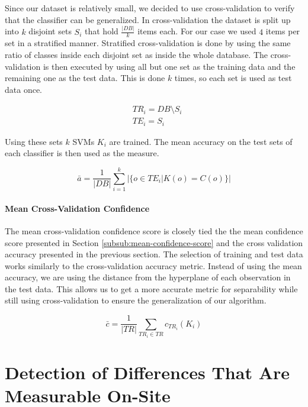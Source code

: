 \documentclass[pdftex,12pt,a4paper]{report}
\begin{document}
Since our dataset is relatively small, we decided to use cross-validation to verify that the classifier can be
generalized. In cross-validation the dataset is split up into $k$ disjoint sets $S_i$ that hold $\frac{|DB|}{k}$ items each. For our case we used $4$ items per set in a stratified manner. Stratified cross-validation is done by using the same ratio of classes inside each disjoint set as inside the whole database. The cross-validation is then
executed by using all but one set as the training data and the remaining one as the test data. This is done $k$ times, so each set is used as test data once.

\begin{equation}
\begin{split}
& TR_i = DB \setminus S_i \\
& TE_i = S_i 
\end{split}
\end{equation}

Using these sets $k$ SVMs $K_i$ are trained. The mean accuracy on the test sets of each classifier is then used
as the measure.

\begin{equation}
\bar{a} = \frac{1}{|DB|} \sum_{i=1}^k | \{o \in TE_i | K(o) = C(o) \}| 
\end{equation}

\subsubsection{Mean Cross-Validation Confidence}
\label{subsub:cross-validation-confidence}

The mean cross-validation confidence score is closely tied the the mean confidence score presented in Section \ref{subsub:mean-confidence-score} and the cross validation accuracy presented in the previous section. The selection of training and test data works similarly to the cross-validation accuracy metric. Instead of using the mean accuracy, we are using the distance from the hyperplane of each observation in the test data. This allows us to get a more accurate metric for separability while still using cross-validation to ensure the generalization of our algorithm.

\begin{equation}
\bar{c} = \frac{1}{|TR|} \sum_{TR_i \in TR} c_{TR_i}(K_i)
\end{equation}

\chapter{Detection of Differences That Are Measurable On-Site}
\label{chapter:measurable-differences}
\end{document}

